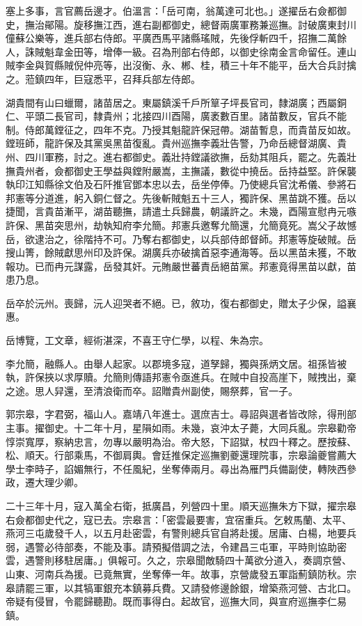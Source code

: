 \begin{pinyinscope}
塞上多事，言官薦岳邊才。伯溫言：「岳可南，翁萬達可北也。」遂擢岳右僉都御史，撫治鄖陽。旋移撫江西，進右副都御史，總督兩廣軍務兼巡撫。討破廣東封川僮蘇公樂等，進兵部右侍郎。平廣西馬平諸縣瑤賊，先後俘斬四千，招撫二萬餘人，誅賊魁韋金田等，增俸一級。召為刑部右侍郎，以御史徐南金言命留任。連山賊李金與賀縣賊倪仲亮等，出沒衡、永、郴、桂，積三十年不能平，岳大合兵討擒之。蒞鎮四年，巨寇悉平，召拜兵部左侍郎。

湖貴間有山曰蠟爾，諸苗居之。東屬鎮溪千戶所筸子坪長官司，隸湖廣；西屬銅仁、平頭二長官司，隸貴州；北接四川酉陽，廣袤數百里。諸苗數反，官兵不能制。侍郎萬鏜征之，四年不克。乃授其魁龍許保冠帶。湖苗暫息，而貴苗反如故。鏜班師，龍許保及其黨吳黑苗復亂。貴州巡撫李義壯告警，乃命岳總督湖廣、貴州、四川軍務，討之。進右都御史。義壯持鏜議欲撫，岳劾其阻兵，罷之。先義壯撫貴州者，僉都御史王學益與鏜附嚴嵩，主撫議，數從中撓岳。岳持益堅。許保襲執印江知縣徐文伯及石阡推官鄧本忠以去，岳坐停俸。乃使總兵官沈希儀、參將石邦憲等分道進，躬入銅仁督之。先後斬賊魁五十三人，獨許保、黑苗跳不獲。岳以捷聞，言貴苗漸平，湖苗聽撫，請遣土兵歸農，朝議許之。未幾，酉陽宣慰冉元嗾許保、黑苗突思州，劫執知府李允簡。邦憲兵邀奪允簡還，允簡竟死。嵩父子故憾岳，欲逮治之，徐階持不可。乃奪右都御史，以兵部侍郎督師。邦憲等旋破賊。岳搜山箐，餘賊獻思州印及許保。湖廣兵亦破擒首惡李通海等。岳以黑苗未獲，不敢報功。已而冉元謀露，岳發其奸。元賄嚴世蕃責岳絕苗黨。邦憲竟得黑苗以獻，苗患乃息。

岳卒於沅州。喪歸，沅人迎哭者不絕。已，敘功，復右都御史，贈太子少保，謚襄惠。

岳博覽，工文章，經術湛深，不喜王守仁學，以程、朱為宗。

李允簡，融縣人。由舉人起家。以郡境多寇，道孥歸，獨與孫炳文居。祖孫皆被執，許保挾以求厚贖。允簡則傳語邦憲令亟進兵。在賊中自投高崖下，賊拽出，棄之途。思人舁還，至清浪衛而卒。詔贈貴州副使，賜祭葬，官一子。

郭宗皋，字君弼，福山人。嘉靖八年進士。選庶吉士。尋詔與選者皆改除，得刑部主事。擢御史。十二年十月，星隕如雨。未幾，哀沖太子薨，大同兵亂。宗皋勸帝惇崇寬厚，察納忠言，勿專以嚴明為治。帝大怒，下詔獄，杖四十釋之。歷按蘇、松、順天。行部乘馬，不御肩輿。會廷推保定巡撫劉夔還理院事，宗皋論夔嘗薦大學士李時子，諂媚無行，不任風紀，坐奪俸兩月。尋出為雁門兵備副使，轉陜西參政，遷大理少卿。

二十三年十月，寇入萬全右衛，抵廣昌，列營四十里。順天巡撫朱方下獄，擢宗皋右僉都御史代之，寇已去。宗皋言：「密雲最要害，宜宿重兵。乞敕馬蘭、太平、燕河三屯歲發千人，以五月赴密雲，有警則總兵官自將赴援。居庸、白楊，地要兵弱，遇警必待部奏，不能及事。請預擬借調之法，令建昌三屯軍，平時則協助密雲，遇警則移駐居庸。」俱報可。久之，宗皋聞敵騎四十萬欲分道入，奏調京營、山東、河南兵為援。已竟無實，坐奪俸一年。故事，京營歲發五軍詣薊鎮防秋。宗皋請罷三軍，以其犒軍銀充本鎮募兵費。又請發修邊餘銀，增築燕河營、古北口。帝疑有侵冒，令罷歸聽勘。既而事得白。起故官，巡撫大同，與宣府巡撫李仁易鎮。


\end{pinyinscope}
